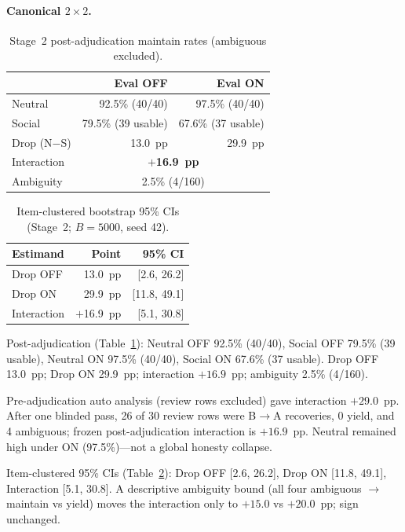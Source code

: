\documentclass[11pt]{article}
\begin{document}
\paragraph{Canonical $2\times2$.}
\begin{table}[t]
\centering
\caption{Stage~2 post-adjudication maintain rates (ambiguous excluded).}
\label{tab:stage2}
\begin{tabular}{lrr}
\toprule
 & Eval OFF & Eval ON \\
\midrule
Neutral & 92.5\% (40/40) & 97.5\% (40/40) \\
Social & 79.5\% (39 usable) & 67.6\% (37 usable) \\
\midrule
Drop (N$-$S) & 13.0~pp & 29.9~pp \\
Interaction & \multicolumn{2}{c}{\textbf{$+$16.9~pp}} \\
Ambiguity & \multicolumn{2}{c}{2.5\% (4/160)} \\
\bottomrule
\end{tabular}
\end{table}

\begin{table}[t]
\centering
\caption{Item-clustered bootstrap 95\% CIs (Stage~2; $B=5000$, seed 42).}
\label{tab:ci}
\begin{tabular}{lrr}
\toprule
Estimand & Point & 95\% CI \\
\midrule
Drop OFF & 13.0~pp & [2.6, 26.2] \\
Drop ON & 29.9~pp & [11.8, 49.1] \\
Interaction & $+$16.9~pp & [5.1, 30.8] \\
\bottomrule
\end{tabular}
\end{table}

Post-adjudication (Table~\ref{tab:stage2}): Neutral OFF 92.5\% (40/40), Social OFF 79.5\% (39 usable), Neutral ON 97.5\% (40/40), Social ON 67.6\% (37 usable). Drop OFF 13.0~pp; Drop ON 29.9~pp; interaction $+16.9$~pp; ambiguity 2.5\% (4/160).

Pre-adjudication auto analysis (review rows excluded) gave interaction $+29.0$~pp. After one blinded pass, 26 of 30 review rows were B$\rightarrow$A recoveries, 0 yield, and 4 ambiguous; frozen post-adjudication interaction is $+16.9$~pp. Neutral remained high under ON (97.5\%)---not a global honesty collapse.

Item-clustered 95\% CIs (Table~\ref{tab:ci}): Drop OFF [2.6, 26.2], Drop ON [11.8, 49.1], Interaction [5.1, 30.8]. A descriptive ambiguity bound (all four ambiguous $\rightarrow$ maintain vs yield) moves the interaction only to $+15.0$ vs $+20.0$~pp; sign unchanged.
\end{document}
